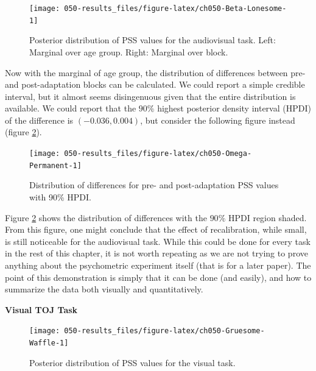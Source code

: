 \documentclass[11pt, oneside, openany]{scrbook}
\begin{document}
\begin{figure}

{\centering \texttt{[image: 050-results\_files/figure-latex/ch050-Beta-Lonesome-1]} 

}

\caption{Posterior distribution of PSS values for the audiovisual task. Left: Marginal over age group. Right: Marginal over block.}\label{fig:ch050-Beta-Lonesome}
\end{figure}

Now with the marginal of age group, the distribution of differences between pre- and post-adaptation blocks can be calculated. We could report a simple credible interval, but it almost seems disingenuous given that the entire distribution is available. We could report that the \(90\%\) highest posterior density interval (HPDI) of the difference is \((-0.036, 0.004)\), but consider the following figure instead (figure \ref{fig:ch050-Omega-Permanent}).

\begin{figure}

{\centering \texttt{[image: 050-results\_files/figure-latex/ch050-Omega-Permanent-1]} 

}

\caption{Distribution of differences for pre- and post-adaptation PSS values with 90\% HPDI.}\label{fig:ch050-Omega-Permanent}
\end{figure}

Figure \ref{fig:ch050-Omega-Permanent} shows the distribution of differences with the \(90\%\) HPDI region shaded. From this figure, one might conclude that the effect of recalibration, while small, is still noticeable for the audiovisual task. While this could be done for every task in the rest of this chapter, it is not worth repeating as we are not trying to prove anything about the psychometric experiment itself (that is for a later paper). The point of this demonstration is simply that it can be done (and easily), and how to summarize the data both visually and quantitatively.

\textbf{Visual TOJ Task}

\begin{figure}

{\centering \texttt{[image: 050-results\_files/figure-latex/ch050-Gruesome-Waffle-1]} 

}

\caption{Posterior distribution of PSS values for the visual task.}\label{fig:ch050-Gruesome-Waffle}
\end{figure}
\end{document}
